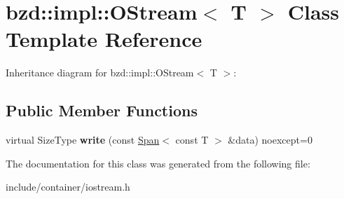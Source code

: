 \hypertarget{classbzd_1_1impl_1_1OStream}{}\section{bzd\+:\+:impl\+:\+:O\+Stream$<$ T $>$ Class Template Reference}
\label{classbzd_1_1impl_1_1OStream}


Inheritance diagram for bzd\+:\+:impl\+:\+:O\+Stream$<$ T $>$\+:
\subsection*{Public Member Functions}
\begin{DoxyCompactItemize}
\item 
\mbox{\label{classbzd_1_1impl_1_1OStream_aa9584f5a3833c56ba7deec2c55231b05}} 
virtual Size\+Type {\bfseries write} (const \hyperlink{classbzd_1_1Span}{Span}$<$ const T $>$ \&data) noexcept=0
\end{DoxyCompactItemize}


The documentation for this class was generated from the following file\+:\begin{DoxyCompactItemize}
\item 
include/container/iostream.\+h\end{DoxyCompactItemize}
